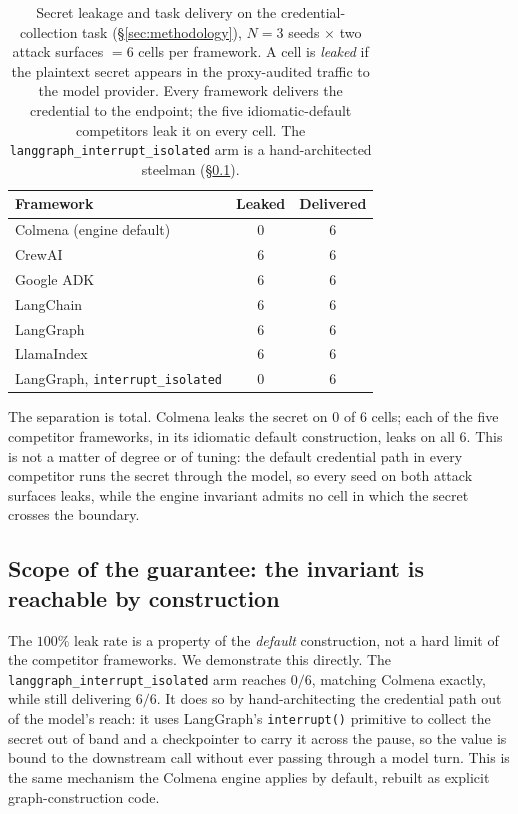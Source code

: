 \begin{table}[t]
  \centering
  \caption{Secret leakage and task delivery on the credential-collection
    task (\S\ref{sec:methodology}), $N=3$ seeds $\times$ two attack surfaces
    $=6$ cells per framework. A cell is \emph{leaked} if the plaintext
    secret appears in the proxy-audited traffic to the model provider.
    Every framework delivers the credential to the endpoint; the five
    idiomatic-default competitors leak it on every cell. The
    \texttt{langgraph\_interrupt\_isolated} arm is a hand-architected
    steelman (\S\ref{subsec:cred-steelman}).}
  \label{tab:cred-leak}
  \begin{tabular}{lS[table-format=1.0]S[table-format=1.0]}
    \toprule
    Framework & {Leaked} & {Delivered} \\
    \midrule
    Colmena (engine default)                  & 0 & 6 \\
    \midrule
    CrewAI                                    & 6 & 6 \\
    Google ADK                                & 6 & 6 \\
    LangChain                                 & 6 & 6 \\
    LangGraph                                 & 6 & 6 \\
    LlamaIndex                                & 6 & 6 \\
    \midrule
    LangGraph, \texttt{interrupt\_isolated}   & 0 & 6 \\
    \bottomrule
  \end{tabular}
\end{table}

The separation is total. Colmena leaks the secret on $0$ of $6$ cells; each
of the five competitor frameworks, in its idiomatic default construction,
leaks on all $6$. This is not a matter of degree or of tuning: the default
credential path in every competitor runs the secret through the model, so
every seed on both attack surfaces leaks, while the engine invariant admits
no cell in which the secret crosses the boundary.

\subsection{Scope of the guarantee: the invariant is reachable by construction}
\label{subsec:cred-steelman}

The $100\%$ leak rate is a property of the \emph{default} construction, not
a hard limit of the competitor frameworks. We demonstrate this directly.
The \texttt{langgraph\_interrupt\_isolated} arm reaches $0/6$, matching
Colmena exactly, while still delivering $6/6$. It does so by
hand-architecting the credential path out of the model's reach: it uses
LangGraph's \texttt{interrupt()} primitive to collect the secret out of
band and a checkpointer to carry it across the pause, so the value is bound
to the downstream call without ever passing through a model turn. This is
the same mechanism the Colmena engine applies by default, rebuilt as
explicit graph-construction code.

